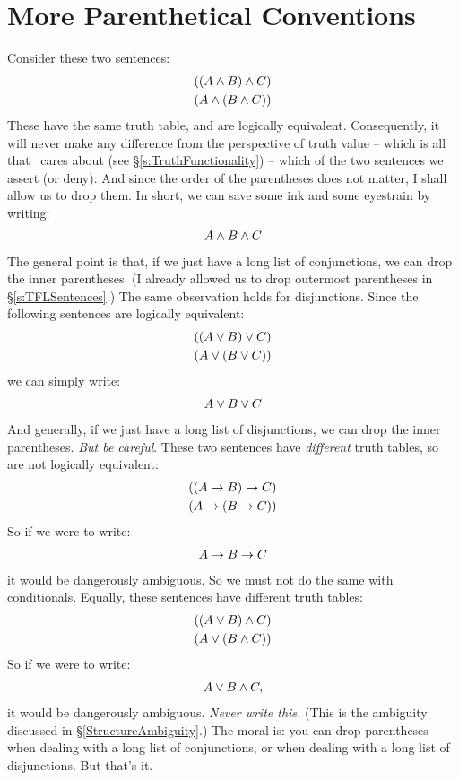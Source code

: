 \section{More Parenthetical Conventions}\label{s:MoreParentheticalConventions}
Consider these two sentences:
	\begin{align*}
		((A \wedge B) \wedge C)\\
		(A \wedge (B \wedge C))
	\end{align*}
These have the same truth table, and are logically equivalent.  Consequently, it will never make any difference from the perspective of truth value – which is all that \TFL\ cares about (see §\ref{s:TruthFunctionality}) – which of the two sentences we assert (or deny). And since the order of the parentheses does not matter, I shall allow us to drop them.  In short, we can save some ink and some eyestrain by writing:
	\begin{align*}
		A \wedge B \wedge C
	\end{align*}
The general point is that, if we just have a long list of conjunctions, we can drop the inner parentheses. (I already allowed us to drop outermost parentheses in §\ref{s:TFLSentences}.) The same observation holds for disjunctions. Since the following sentences are logically equivalent:
	\begin{align*}
		((A \vee B) \vee C)\\
		(A \vee (B \vee C))
	\end{align*}
we can simply write:
	\begin{align*}
		A \vee B \vee C
	\end{align*}
And generally, if we just have a long list of disjunctions, we can drop the inner parentheses. \emph{But be careful}. These two sentences have \emph{different} truth tables, so are not logically equivalent:
	\begin{align*}
		((A \rightarrow B) \rightarrow C)\\
		(A \rightarrow (B \rightarrow C))
	\end{align*}
So if we were to write:
	\begin{align*}
		A \rightarrow B \rightarrow C
	\end{align*}
it would be dangerously ambiguous. So we must not do the same with conditionals. Equally, these sentences have different truth tables:
	\begin{align*}
		((A \vee B) \wedge C)\\
		(A \vee (B \wedge C))
	\end{align*}
So if we were to write:
	\begin{align*}
		A \vee B \wedge C,
	\end{align*}
it would be dangerously ambiguous. \emph{Never write this.} (This is the ambiguity discussed in §\ref{StructureAmbiguity}.) The moral is: you can drop parentheses when dealing with a long list of conjunctions, or when dealing with a long list of disjunctions. But that's it.


